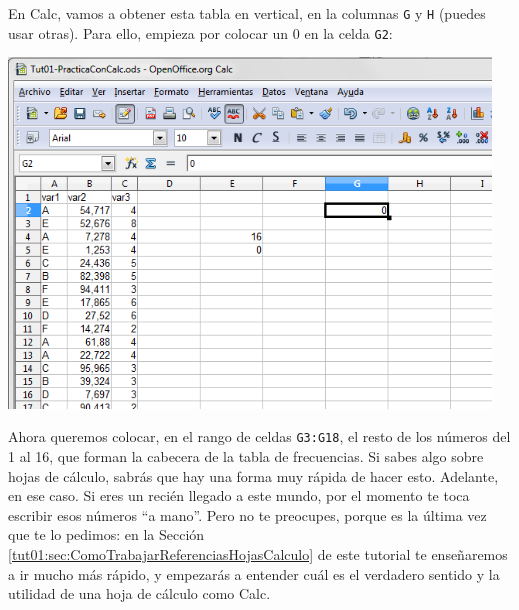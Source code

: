\documentclass[10pt,a4paper]{article}\usepackage[]{graphicx}\usepackage[]{color}
\begin{document}
En Calc, vamos a obtener esta tabla en vertical, en la columnas {\tt G} y {\tt H} (puedes usar otras). Para ello, empieza por  colocar un 0 en la celda {\tt G2}:
    \begin{center}
    \includegraphics[height=9.3cm]{../fig/Tut01-Calc-tablaFrec-11.png}
    \end{center}
Ahora queremos colocar, en el rango de celdas {\tt G3:G18}, el resto de los números del 1 al 16, que forman la cabecera de la tabla de frecuencias. Si sabes algo sobre hojas de cálculo, sabrás que hay una forma muy rápida de hacer esto. Adelante, en ese caso. Si eres un recién llegado a este mundo, por el momento te toca escribir esos números ``a mano''. Pero no te preocupes, porque es la última vez que te lo pedimos: en la Sección \ref{tut01:sec:ComoTrabajarReferenciasHojasCalculo} de este tutorial te enseñaremos a ir mucho más rápido, y empezarás a entender cuál es el verdadero sentido y la utilidad de una hoja de cálculo como Calc.

\newpage
\end{document}
